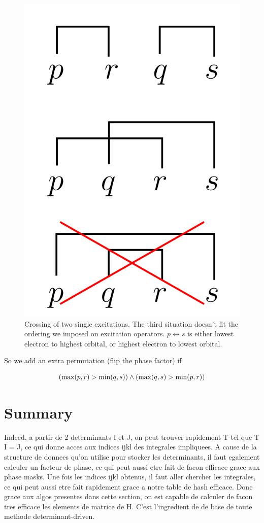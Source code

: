 \documentclass[./thesis.tex]{subfiles}
\begin{document}
\begin{figure}[h!]
	\begin{center}
		\includegraphics[width=0.2\columnwidth]{figures/determinant_driven/biphasefactor}
		\caption{
		\label{fig:biphasefactor}%
		Crossing of two single excitations.
		The third situation doesn't fit the ordering we imposed on excitation operators. $p \leftrightarrow s$ is either lowest electron to highest orbital, or highest electron to lowest orbital.
		}
	\end{center}
\end{figure}

So we add an extra permutation (flip the phase factor) if

\begin{equation}
 \qty( \max(p,r) > \min(q,s) ) \wedge \qty( \max(q,s) > \min(p,r) )
\end{equation}


\section{Summary}
\alert{
Indeed, a partir de 2 determinants I et J, on peut trouver rapidement T tel que T I = J, ce qui donne acces aux indices ijkl des integrales impliquees. A cause de la structure de donnees qu'on utilise pour stocker les determinants, il faut egalement calculer un facteur de phase, ce qui peut aussi etre fait de facon efficace grace aux phase masks. Une fois les indices ijkl obtenus, il faut aller chercher les integrales, ce qui peut aussi etre fait rapidement grace a notre table de hash efficace.
Donc grace aux algos presentes dans cette section, on est capable de calculer de facon tres efficace les elements de matrice de H. C'est l'ingredient de de base de toute methode determinant-driven.
}
\end{document}
